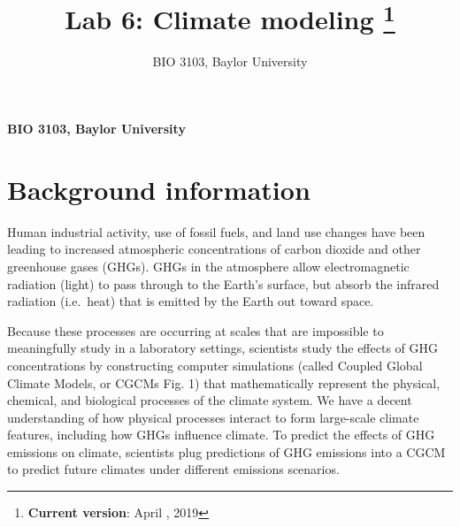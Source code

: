 \documentclass[11pt,]{article}
\title{Lab 6: Climate modeling \thanks{\textbf{Current version}: April , 2019}  }
\author{\Large BIO 3103, Baylor University\vspace{0.05in} \newline\normalsize\emph{}  }
\date{}
\newcommand*{\authorfont}{\fontfamily{phv}\selectfont}
\begin{document}
	
%



{%
\setlength{\parindent}{0pt}
\thispagestyle{plain}
{\fontsize{18}{20}\selectfont\raggedright 
\maketitle  %

}

{
   \vskip 13.5pt\relax \normalsize\fontsize{11}{12} 
\textbf{\authorfont BIO 3103, Baylor University} \hskip 15pt \emph{\small }   

}

}




\noindent  \section{Background information}\label{background-information}

Human industrial activity, use of fossil fuels, and land use changes
have been leading to increased atmospheric concentrations of carbon
dioxide and other greenhouse gases (GHGs). GHGs in the atmosphere allow
electromagnetic radiation (light) to pass through to the Earth's
surface, but absorb the infrared radiation (i.e.~heat) that is emitted
by the Earth out toward space.

Because these processes are occurring at scales that are impossible to
meaningfully study in a laboratory settings, scientists study the
effects of GHG concentrations by constructing computer simulations
(called Coupled Global Climate Models, or CGCMs Fig. 1) that
mathematically represent the physical, chemical, and biological
processes of the climate system. We have a decent understanding of how
physical processes interact to form large-scale climate features,
including how GHGs influence climate. To predict the effects of GHG
emissions on climate, scientists plug predictions of GHG emissions into
a CGCM to predict future climates under different emissions scenarios.
\end{document}
